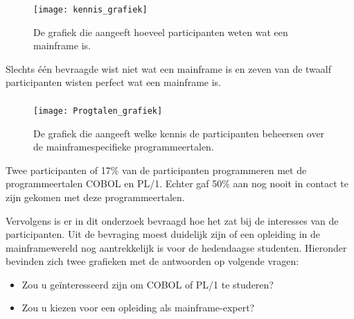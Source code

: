 \subsubsection{}
\label{sec:Weet u wat een mainframe is?}

 \begin{figure}[h]
    \centering
    \texttt{[image: kennis\_grafiek]}
    \caption{De grafiek die aangeeft hoeveel participanten weten wat een mainframe is.}
\end{figure}

Slechts één bevraagde wist niet wat een mainframe is en zeven van de twaalf participanten wisten perfect wat een mainframe is. 

\newpage

\subsubsection{}
\label{sec:Heeft u ervaring of bent u al in contact geweest met de programmeertalen COBOL of PL/1?}

 \begin{figure}[h]
    \centering
    \texttt{[image: Progtalen\_grafiek]}
    \caption{De grafiek  die aangeeft welke kennis de participanten beheersen over de mainframespecifieke programmeertalen.}
\end{figure}

Twee participanten of 17\% van de participanten programmeren met de programmeertalen COBOL en PL/1. Echter gaf 50\% aan nog nooit in contact te zijn gekomen met deze programmeertalen. 

Vervolgens is er in dit onderzoek bevraagd hoe het zat bij de interesses van de participanten. Uit de bevraging moest duidelijk zijn of een opleiding in de mainframewereld nog aantrekkelijk is voor de hedendaagse studenten. Hieronder bevinden zich twee grafieken met de antwoorden op volgende vragen:
  \begin{itemize}
    \item Zou u geïnteresseerd zijn om COBOL of PL/1 te studeren?
    \item Zou u kiezen voor een opleiding als mainframe-expert?
\end{itemize}

